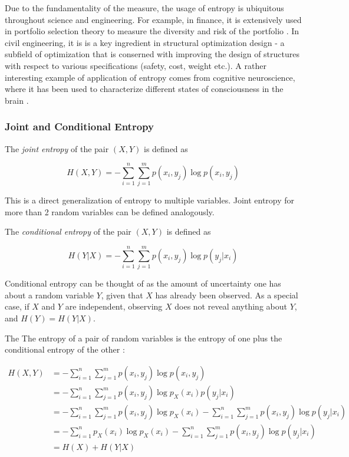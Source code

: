 \documentclass[12pt]{article}
\begin{document}
Due to the fundamentality of the measure, the usage of entropy is ubiquitous throughout science and engineering. For example, in finance, it is extensively used in portfolio selection theory to measure the diversity and risk of the portfolio \cite{entropy-finance}. In civil engineering, it is is a key ingredient in structural optimization design \cite{entropy-civil-eng} - a subfield of optimization that is conserned with improving the design of structures with respect to various specifications (safety, cost, weight etc.). A rather interesting example of application of entropy comes from cognitive neuroscience, where it has been used to characterize different states of consciousness in the brain \cite{entropy-consciousness}.

\subsubsection{Joint and Conditional Entropy}

The \textit{joint entropy} \cite{cover-thomas} of the pair $(X,Y)$ is defined as 

\begin{equation}
H(X,Y) = -\sum_{i=1}^n \sum_{j=1}^m p(x_i,y_j) \log p(x_i,y_j)
\label{eq:cond-etropy}
\end{equation}

This is a direct generalization of entropy to multiple variables. Joint entropy for more than 2 random variables can be defined analogously.

The \textit{conditional entropy} \cite{cover-thomas} of the pair $(X,Y)$ is defined as 

\begin{equation}
H(Y|X) = - \sum_{i=1}^n \sum_{j=1}^m p(x_i,y_j) \log p(y_j|x_i)
\end{equation}

Conditional entropy can be thought of as the amount of uncertainty one has about a random variable $Y$, given that $X$ has already been observed. As a special case, if $X$ and $Y$ are independent, observing $X$ does not reveal anything about $Y$, and $H(Y) = H(Y|X)$.

The  
The entropy of a pair of random variables is the entropy of one plus the conditional entropy of the other \cite{cover-thomas}: 

\begin{equation}
\begin{split}
H(X,Y) & = -\sum_{i=1}^n \sum_{j=1}^m p(x_i,y_j) \log p(x_i,y_j) \\
 	   & = -\sum_{i=1}^n \sum_{j=1}^m p(x_i,y_j) \log p_X(x_i)p(y_j|x_i) \\ 
 	   & = -\sum_{i=1}^n \sum_{j=1}^m p(x_i,y_j) \log p_X(x_i) - \sum_{i=1}^n \sum_{j=1}^m p(x_i,y_j) \log p(y_j|x_i) \\
 	   & = -\sum_{i=1}^n p_X(x_i) \log p_X(x_i) - \sum_{i=1}^n \sum_{j=1}^m p(x_i,y_j) \log p(y_j|x_i) \\ 
 	   & = H(X) + H(Y|X)
\label{eq:chain-rule-entropy}
\end{split}
\end{equation}
\end{document}
